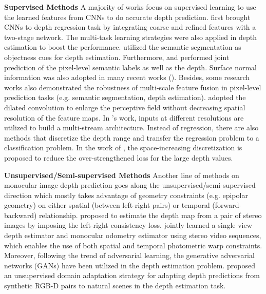 \documentclass[letterpaper]{article} \usepackage{aaai20}  \usepackage{times}  \usepackage{helvet} \usepackage{courier}  \usepackage{graphicx} \frenchspacing  \setlength{\pdfpagewidth}{8.5in}  \setlength{\pdfpageheight}{11in}  \usepackage{epsfig}
\begin{document}
    \textbf{Supervised Methods} \hspace{0.3cm} A majority of works focus on supervised learning to use the learned features from CNNs to do accurate depth prediction. \cite{Eigen2014Depth} first brought CNNs to depth regression task by integrating coarse and refined features with a two-stage network. The multi-task learning strategies were also applied in depth estimation to boost the performance. \cite{Liu2010Single} utilized the semantic segmentation as objectness cues for depth estimation. Furthermore, \cite{Shi2014Pulling} and \cite{Xu2018PAD} performed joint prediction of the pixel-level semantic labels as well as the depth. Surface normal information was also adopted in many recent works (\cite{Eigen2015Predicting,Zhou2017Unsupervised,Wang2015Towards,Qi2018GeoNetG}). Besides, some research works also demonstrated the robustness of multi-scale feature fusion in pixel-level prediction tasks (e.g. semantic segmentation, depth estimation). \cite{Fu2018Deep} adopted the dilated convolution to enlarge the perceptive field without decreasing spatial resolution of the feature maps. In \cite{Buyssens2012Multiscale}'s work, inputs at different resolutions are utilized to build a multi-stream architecture. Instead of regression, there are also methods that discretize the depth range and transfer the regression problem to a classification problem. In the work of \cite{Fu2018Deep},  the space-increasing discretization is proposed to reduce the over-strengthened loss for the large depth values.
    
    \textbf{Unsupervised/Semi-supervised Methods} \hspace{0.3cm}  Another line of methods on monocular image depth prediction goes along the unsupervised/semi-supervised direction which mostly takes advantage of geometry constraints (e.g. epipolar geometry) on either spatial (between left-right pairs) or temporal (forward-backward) relationship. \cite{Garg2016Unsupervised} proposed to estimate the depth map from a pair of stereo images by imposing the left-right consistency loss. \cite{Zhan2018Unsupervised} jointly learned a single view depth estimator and monocular odometry estimator using stereo video sequences, which enables the use of both spatial and temporal photometric warp constraints. Moreover, following the trend of adversarial learning, the generative adversarial networks (GANs) have been utilized in the depth estimation problem. \cite{Kundu2018AdaDepth} proposed an unsupervised domain adaptation strategy for adapting depth predictions from synthetic RGB-D pairs to natural scenes in the depth estimation task.
    
\end{document}
